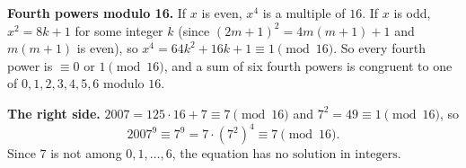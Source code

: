 \textbf{Fourth powers modulo 16.} If $x$ is even, $x^4$ is a multiple of $16$. If $x$ is odd, $x^2=8k+1$ for some integer $k$ (since $(2m+1)^2=4m(m+1)+1$ and $m(m+1)$ is even), so $x^4=64k^2+16k+1\equiv1\pmod{16}$. So every fourth power is $\equiv0$ or $1\pmod{16}$, and a sum of six fourth powers is congruent to one of $0,1,2,3,4,5,6$ modulo $16$.

\textbf{The right side.} $2007=125\cdot16+7\equiv7\pmod{16}$ and $7^2=49\equiv1\pmod{16}$, so
\[2007^9\equiv7^9=7\cdot\left(7^2\right)^4\equiv7\pmod{16}.\]
Since $7$ is not among $0,1,\dots,6$, the equation has $\boxed{\text{no solution in integers}}$.
